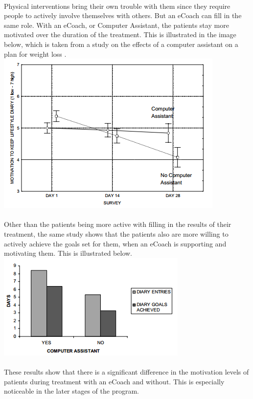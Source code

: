 \documentclass[english,a4paper,pdftex]{report}
\begin{document}
\paragraph{}
Physical interventions bring their own trouble with them since they require people to actively involve themselves with others. But an eCoach can fill in the same role. With an eCoach, or Computer Assistant, the patients stay more motivated over the duration of the treatment. This is illustrated in the image below, which is taken from a study on the effects of a computer assistant on a plan for weight loss \cite{blanson2009online}.\\
\includegraphics[scale=0.8]{Graph1.png}
\paragraph{}
Other than the patients being more active with filling in the results of their treatment, the same study shows that the patients also are more willing to actively achieve the goals set for them, when an eCoach is supporting and motivating them. This is illustrated below.\\
\includegraphics[scale=1]{Graph2.png}
\paragraph{}
These results show that there is a significant difference in the motivation levels of patients during treatment with an eCoach and without. This is especially noticeable in the later stages of the program.
\end{document}
